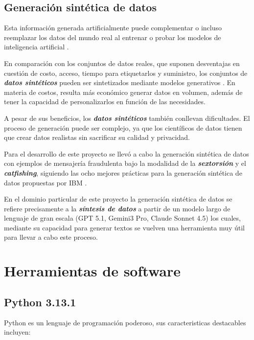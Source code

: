 \subsection{Generación sintética de datos}

Esta información generada artificialmente puede complementar o incluso reemplazar los datos del mundo real al entrenar o probar los modelos de inteligencia artificial \cite{AIbyIBM}.

En comparación con los conjuntos de datos reales, que suponen desventajas en cuestión de costo, acceso, tiempo para etiquetarlos y suministro, los conjuntos de \textbf{\textit{datos sintéticos}} pueden ser sintetizados mediante modelos generativos \cite{GenModelsByIbm}. En materia de costos, resulta más económico generar datos en volumen, además de tener la capacidad de personalizarlos en función de las necesidades.

A pesar de sus beneficios, los \textbf{\textit{datos sintéticos}} \cite{SynthDataByImb} también conllevan dificultades. El proceso de generación puede ser complejo, ya que los científicos de datos tienen que crear datos realistas sin sacrificar su calidad y privacidad.

Para el desarrollo de este proyecto se llevó a cabo la generación sintética de datos con ejemplos de mensajería fraudulenta bajo la modalidad de la \textbf{\textit{sextorsión}} y el \textbf{\textit{catfishing}}, siguiendo las ocho mejores prácticas para la generación sintética de datos propuestas por IBM \cite{SynthDataByIbm}.

En el dominio particular de este proyecto la generación sintética de datos se refiere precisamente a la \textbf{\textit{síntesis de datos}} a partir de un modelo largo de lenguaje de gran escala (GPT 5.1, Gemini3 Pro, Claude Sonnet 4.5) los cuales, mediante su capacidad para generar textos se vuelven una herramienta muy útil para llevar a cabo este proceso. \cite{artificialanalysis}

\section{Herramientas de software}

\subsection{Python 3.13.1}

Python es un lenguaje de programación poderoso, sus caracteristicas destacables incluyen:

